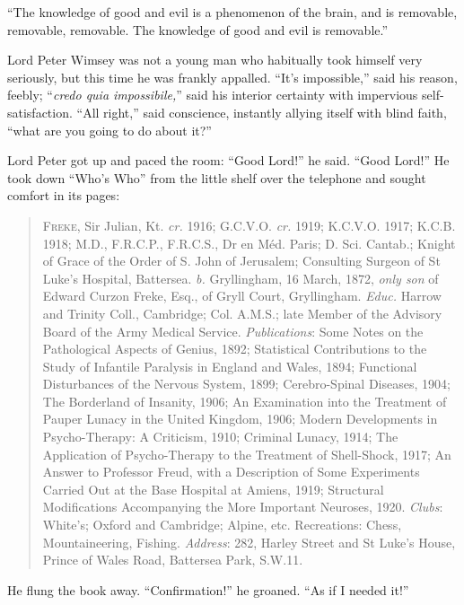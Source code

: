 \enquote{The knowledge of good and evil is a phenomenon of the brain, and is removable, removable, removable. The knowledge of good and evil is removable.}

Lord Peter Wimsey was not a young man who habitually took himself very seriously, but this time he was frankly appalled. \enquote{It’s impossible,} said his reason, feebly; \enquote{\textit{credo quia impossibile,}} said his interior certainty with impervious self-satisfaction. \enquote{All right,} said conscience, instantly allying itself with blind faith, \enquote{what are you going to do about it?}

Lord Peter got up and paced the room: \enquote{Good Lord!} he said. \enquote{Good Lord!} He took down \enquote{Who’s Who} from the little shelf over the telephone and sought comfort in its pages:

\begin{quote}
\textsc{Freke}, Sir Julian, Kt. \textit{cr.} 1916; G.C.V.O. \textit{cr.} 1919; K.C.V.O. 1917; K.C.B. 1918; M.D., F.R.C.P., F.R.C.S., Dr en Méd. Paris; D. Sci. Cantab.; Knight of Grace of the Order of S. John of Jerusalem; Consulting Surgeon of St Luke’s Hospital, Battersea. \textit{b.} Gryllingham, 16 March, 1872, \textit{only son} of Edward Curzon Freke, Esq., of Gryll Court, Gryllingham. \textit{Educ.} Harrow and Trinity Coll., Cambridge; Col. A.M.S.; late Member of the Advisory Board of the Army Medical Service. \textit{Publications}: Some Notes on the Pathological Aspects of Genius, 1892; Statistical Contributions to the Study of Infantile Paralysis in England and Wales, 1894; Functional Disturbances of the Nervous System, 1899; Cerebro-Spinal Diseases, 1904; The Borderland of Insanity, 1906; An Examination into the Treatment of Pauper Lunacy in the United Kingdom, 1906; Modern Developments in Psycho-Therapy: A Criticism, 1910; Criminal Lunacy, 1914; The Application of Psycho-Therapy to the Treatment of Shell-Shock, 1917; An Answer to Professor Freud, with a Description of Some Experiments Carried Out at the Base Hospital at Amiens, 1919; Structural Modifications Accompanying the More Important Neuroses, 1920. \textit{Clubs}: White’s; Oxford and Cambridge; Alpine, etc. Recreations: Chess, Mountaineering, Fishing. \textit{Address}: 282, Harley Street and St Luke’s House, Prince of Wales Road, Battersea Park, S.W.11.
\end{quote}

He flung the book away. \enquote{Confirmation!} he groaned. \enquote{As if I needed it!}

